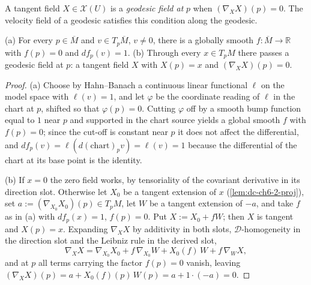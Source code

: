 \begin{definition}
  \label{def:dc-ch6-2-9-geodesic-field}
  \leanok
  A tangent field $X\in\mathcal{X}(U)$ is a \emph{geodesic field at} $p$ when
  $(\nabla_X X)(p)=0$. The velocity field of a geodesic satisfies this condition
  along the geodesic.
\end{definition}

\begin{lemma}
  \label{lem:dc-ch6-2-9-existence}
  \leanok
  (a) For every $p\in\overline{M}$ and $v\in T_p\overline{M}$, $v\neq0$, there is a
  globally smooth $f:\overline{M}\to\mathbb{R}$ with $f(p)=0$ and $df_p(v)=1$.
  (b) Through every $x\in T_pM$ there passes a geodesic field at $p$: a tangent
  field $X$ with $X(p)=x$ and $(\nabla_X X)(p)=0$.
\end{lemma}
\begin{proof}
  \leanok
  \sketch
  (a) Choose by Hahn--Banach a continuous linear functional $\ell$ on the model
  space with $\ell(v)=1$, and let $\varphi$ be the coordinate reading of $\ell$
  in the chart at $p$, shifted so that $\varphi(p)=0$. Cutting $\varphi$ off by
  a smooth bump function equal to $1$ near $p$ and supported in the chart source
  yields a global smooth $f$ with $f(p)=0$; since the cut-off is constant near
  $p$ it does not affect the differential, and $df_p(v)=\ell(d(\mathrm{chart})_p
  v)=\ell(v)=1$ because the differential of the chart at its base point is the
  identity.

  (b) If $x=0$ the zero field works, by tensoriality of the covariant derivative
  in its direction slot. Otherwise let $X_0$ be a tangent extension of $x$
  (\cref{lem:dc-ch6-2-proj}), set $a:=(\nabla_{X_0}X_0)(p)\in T_pM$, let $W$ be a
  tangent extension of $-a$, and take $f$ as in (a) with $df_p(x)=1$, $f(p)=0$.
  Put $X:=X_0+fW$; then $X$ is tangent and $X(p)=x$. Expanding
  $\nabla_{X}X$ by additivity in both slots, $\mathcal{D}$-homogeneity in the
  direction slot and the Leibniz rule in the derived slot,
  $$
  \nabla_X X=\nabla_{X_0}X_0+f\,\nabla_{X_0}W+X_0(f)\,W+f\,\nabla_{W}X ,
  $$
  and at $p$ all terms carrying the factor $f(p)=0$ vanish, leaving
  $(\nabla_XX)(p)=a+X_0(f)(p)\,W(p)=a+1\cdot(-a)=0$.
\end{proof}

